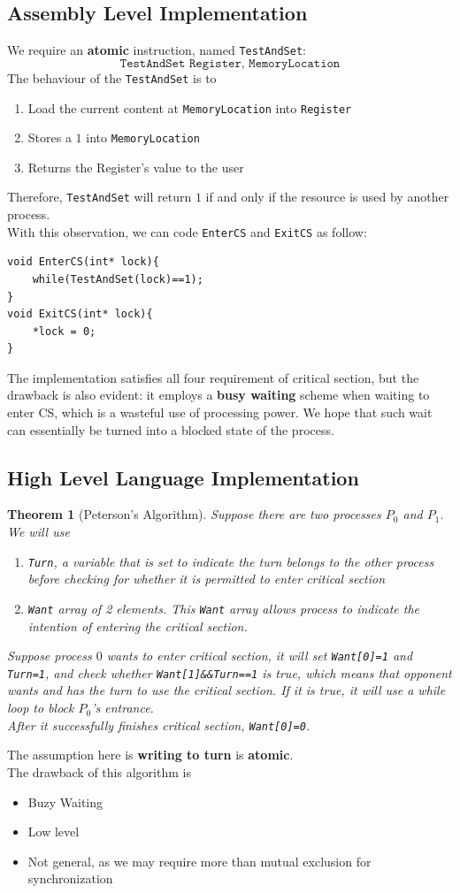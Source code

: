 \documentclass[11pt]{article}
\newtheorem{theorem}{Theorem}[section]
\theoremstyle{definition}
\begin{document}
\subsection{Assembly Level Implementation}
We require an \textbf{atomic} instruction, named \texttt{TestAndSet}:
\[
\texttt{TestAndSet Register, MemoryLocation}
\]
The behaviour of the \texttt{TestAndSet} is to 
\begin{enumerate}
  \item Load the current content at \texttt{MemoryLocation} into \texttt{Register}
  \item Stores a $1$ into \texttt{MemoryLocation}
  \item Returns the Register's value to the user
\end{enumerate}
Therefore, \texttt{TestAndSet} will return $1$ if and only if the resource is used by another process.\\
With this observation, we can code \texttt{EnterCS} and \texttt{ExitCS} as follow:
\begin{verbatim}
void EnterCS(int* lock){
    while(TestAndSet(lock)==1);
}
void ExitCS(int* lock){
    *lock = 0;
}
\end{verbatim}
The implementation satisfies all four requirement of critical section, but the drawback is also evident: it employs a \textbf{busy waiting} scheme when waiting to enter CS, which is a wasteful use of processing power. We hope that such wait can essentially be turned into a blocked state of the process.
\subsection{High Level Language Implementation}
\begin{theorem}[Peterson's Algorithm]
\normalfont Suppose there are two processes $P_0$ and $P_1$. We will use 
\begin{enumerate}
  \item \texttt{Turn}, a variable that is set to indicate the turn belongs to the other process before checking for whether it is permitted to enter critical section
  \item \texttt{Want} array of 2 elements. This \texttt{Want} array allows process to indicate the intention of entering the critical section.
\end{enumerate}
Suppose process $0$ wants to enter critical section, it will set \texttt{Want[0]=1} and \texttt{Turn=1}, and check whether \texttt{Want[1]\&\&Turn==1} is true, which means that opponent wants and has the turn to use the critical section. If it is true, it will use a while loop to block $P_0$'s entrance.\\
After it successfully finishes critical section, \texttt{Want[0]=0}.
\end{theorem}
The assumption here is \textbf{writing to turn} is \textbf{atomic}.\\
The drawback of this algorithm is 
\begin{itemize}[itemsep=0pt]
  \item Buzy Waiting
  \item Low level
  \item Not general, as we may require more than mutual exclusion for synchronization
\end{itemize}
\end{document}
